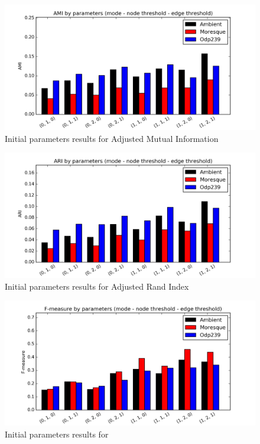 \documentclass[a4paper, 12pt, oneside]{Thesis} %
\begin{document}
\begin{figure}[h]
  \centering
  \includegraphics[width=1.0\linewidth]{Figures/initial_params_reult_AMI.png}
  \caption{Initial parameters results for Adjusted Mutual Information}
  \label{fig:initparamsfig1}
\end{figure}

\begin{figure}[h]
  \centering
  \includegraphics[width=1.0\linewidth]{Figures/initial_params_reult_ARI.png}
  \caption{Initial parameters results for Adjusted Rand Index}
  \label{fig:initparamsfig2}
\end{figure}

\begin{figure}[h]
  \centering
  \includegraphics[width=1.0\linewidth]{Figures/initial_params_reult_F-measure-classic.png}
  \caption{Initial parameters results for }
  \label{fig:initparamsfig3}
\end{figure}
\end{document}
